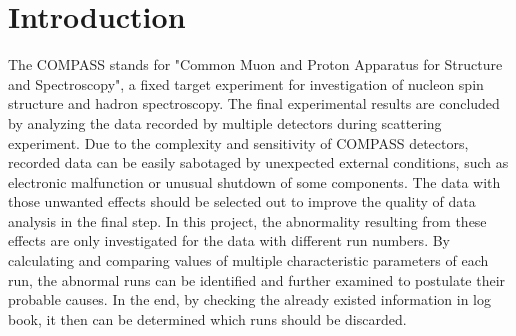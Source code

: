 \section{Introduction}
The COMPASS stands for "Common Muon and Proton Apparatus for Structure and Spectroscopy", a fixed target experiment for investigation of nucleon spin structure and hadron spectroscopy. The final experimental results are concluded by analyzing the data recorded by multiple detectors during scattering experiment. Due to the complexity and sensitivity of COMPASS detectors, recorded data can be easily sabotaged by unexpected external conditions, such as electronic malfunction or unusual shutdown of some components. The data with those unwanted effects should be selected out to improve the quality of data analysis in the final step. In this project, the abnormality resulting from these effects are only investigated for the data with different run numbers. By calculating and comparing values of multiple characteristic parameters of each run, the abnormal runs can be identified and further examined to postulate their probable causes. In the end, by checking the already existed information in log book, it then can be determined which runs should be discarded.